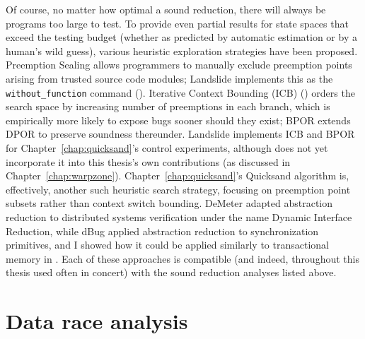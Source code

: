 Of course, no matter how optimal a sound reduction, there will always be programs too large to test.
To provide even partial results for state spaces that exceed the testing budget
(whether as predicted by automatic estimation \cite{estimation} or by a human's wild guess),
various heuristic exploration strategies have been proposed.
Preemption Sealing \cite{sealing} allows programmers to manually exclude preemption points
arising from trusted source code modules;
Landslide implements this as the {\tt without\_function} command (\sect{\ref{sec:landslide-pps}}).
Iterative Context Bounding (ICB) \cite{chess-icb} (\sect{\ref{sec:landslide-icb}})
orders the search space by increasing number of preemptions in each branch,
which is empirically more likely to expose bugs sooner should they exist;
BPOR \cite{bpor} extends DPOR to preserve soundness
thereunder. %
Landslide implements ICB and BPOR for Chapter~\ref{chap:quicksand}'s control experiments,
although does not yet incorporate it into this thesis's own contributions
(as discussed in Chapter~\ref{chap:warpzone}).
Chapter~\ref{chap:quicksand}'s Quicksand algorithm is, effectively, another such heuristic search strategy,
focusing on preemption point subsets rather than context switch bounding.
DeMeter \cite{demeter} adapted abstraction reduction to distributed systems verification under the name Dynamic Interface Reduction,
while dBug \cite{dbug-phdthesis} applied abstraction reduction to synchronization primitives,
and I showed how it could be applied similarly to transactional memory in \sect{\ref{sec:tm-abstraction}}.
Each of these approaches is compatible (and indeed, throughout this thesis used often in concert)
with the sound reduction analyses listed above.




\section{Data race analysis}
\label{sec:related-data-race}

